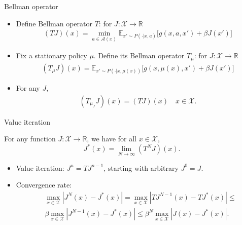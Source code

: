 \documentclass{beamer}
\def\R{{\mathbb R}}
\def\X{{\mathcal X}}
\def\E{{\mathbb E}}
\def\A{{\mathcal A}}
\begin{document}




\begin{frame}{Bellman operator}
\begin{itemize}
  \item Define Bellman operator $T$:  for  $J:\X\rightarrow \R$
    \begin{align*}
      (TJ)(x) = \min\limits_{a\in \A(x)} \E_{x'\sim P(\cdot|x, a)}\Big[ g(x, a, x') +\beta J(x') \Big]
          \end{align*}

  \item Fix a  stationary policy $\mu$. Define its Bellman operator $T_\mu$:  for  $J:\X\rightarrow \R$
    \begin{align*}
(T_\mu J)(x) = \E_{x'\sim P(\cdot|x, \mu(x))}\Big[ g(x, \mu(x), x') +\beta J(x') \Big]
    \end{align*}
\item For any $J$,
  \begin{align*}
    (T_{\mu_J}J )(x) = (T J)(x) \quad x\in \mathcal{X}.
  \end{align*}

\end{itemize}
\end{frame}





\begin{frame}{Value iteration}
\begin{theorem}
For any function $J:\X\rightarrow \R$, we have for all $x\in \X$,
\begin{equation*}
J^*(x) = \lim\limits_{N\rightarrow \infty} (T^N J)(x).
\end{equation*}\end{theorem}
\begin{itemize}

\item Value iteration: $J^{n} = TJ^{n-1}$, starting with arbitrary $J^0 = J.$
\item Convergence rate:
  \begin{align*}
& \max\limits_{x\in \X}|J^N(x)  - J^*(x)|  = \max\limits_{x\in \X}|T J^{N-1}(x)  - TJ^*(x)|\leq \\
& \beta\max\limits_{x\in \X}|J^{N-1}(x)  - J^*(x)|\leq\beta^N\max\limits_{x\in \X}|J(x)  - J^*(x)|.
\end{align*}

\end{itemize}
\end{frame}
\end{document}
